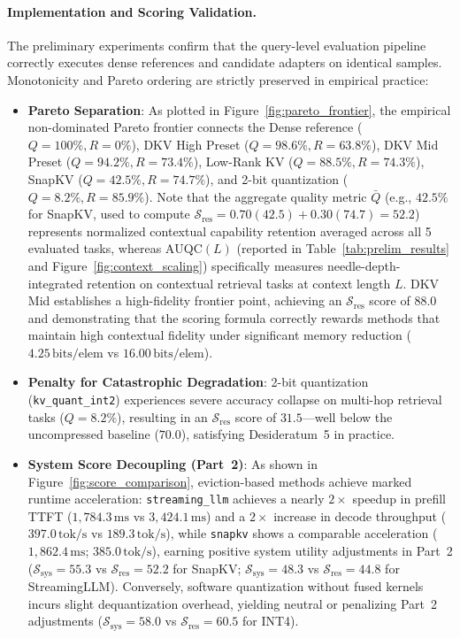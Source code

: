 \documentclass[11pt,a4paper]{article}
\begin{document}
\paragraph{Implementation and Scoring Validation.}
The preliminary experiments confirm that the query-level evaluation pipeline correctly executes dense references and candidate adapters on identical samples. Monotonicity and Pareto ordering are strictly preserved in empirical practice:
\begin{itemize}[leftmargin=*]
    \item \textbf{Pareto Separation}: As plotted in Figure~\ref{fig:pareto_frontier}, the empirical non-dominated Pareto frontier connects the Dense reference ($Q=100\%, R=0\%$), DKV High Preset ($Q=98.6\%, R=63.8\%$), DKV Mid Preset ($Q=94.2\%, R=73.4\%$), Low-Rank KV ($Q=88.5\%, R=74.3\%$), SnapKV ($Q=42.5\%, R=74.7\%$), and 2-bit quantization ($Q=8.2\%, R=85.9\%$). Note that the aggregate quality metric $\bar{Q}$ (e.g., $42.5\%$ for SnapKV, used to compute $\mathcal{S}_{\text{res}} = 0.70(42.5) + 0.30(74.7) = 52.2$) represents normalized contextual capability retention averaged across all 5 evaluated tasks, whereas $\text{AUQC}(L)$ (reported in Table~\ref{tab:prelim_results} and Figure~\ref{fig:context_scaling}) specifically measures needle-depth-integrated retention on contextual retrieval tasks at context length $L$. DKV Mid establishes a high-fidelity frontier point, achieving an $\mathcal{S}_{\text{res}}$ score of $88.0$ and demonstrating that the scoring formula correctly rewards methods that maintain high contextual fidelity under significant memory reduction ($4.25\,\text{bits/elem}$ vs $16.00\,\text{bits/elem}$).
    \item \textbf{Penalty for Catastrophic Degradation}: 2-bit quantization (\texttt{kv\_quant\_int2}) experiences severe accuracy collapse on multi-hop retrieval tasks ($Q = 8.2\%$), resulting in an $\mathcal{S}_{\text{res}}$ score of $31.5$---well below the uncompressed baseline ($70.0$), satisfying Desideratum~5 in practice.
    \item \textbf{System Score Decoupling (Part~2)}: As shown in Figure~\ref{fig:score_comparison}, eviction-based methods achieve marked runtime acceleration: \texttt{streaming\_llm} achieves a nearly $2\times$ speedup in prefill TTFT ($1,784.3\,\text{ms}$ vs $3,424.1\,\text{ms}$) and a $2\times$ increase in decode throughput ($397.0\,\text{tok/s}$ vs $189.3\,\text{tok/s}$), while \texttt{snapkv} shows a comparable acceleration ($1,862.4\,\text{ms}$; $385.0\,\text{tok/s}$), earning positive system utility adjustments in Part~2 ($\mathcal{S}_{\text{sys}} = 55.3$ vs $\mathcal{S}_{\text{res}} = 52.2$ for SnapKV; $\mathcal{S}_{\text{sys}} = 48.3$ vs $\mathcal{S}_{\text{res}} = 44.8$ for StreamingLLM). Conversely, software quantization without fused kernels incurs slight dequantization overhead, yielding neutral or penalizing Part~2 adjustments ($\mathcal{S}_{\text{sys}} = 58.0$ vs $\mathcal{S}_{\text{res}} = 60.5$ for INT4).
\end{itemize}
\end{document}

